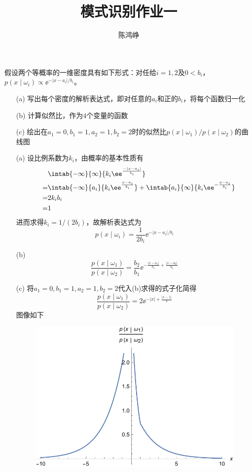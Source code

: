 \documentclass[reportComp]{thesis}
\title{模式识别作业一}
\subtitle{}
\author{陈鸿峥}
\begin{document}
\maketitle

\begin{question}[\textsection 2 Q2]
假设两个等概率的一维密度具有如下形式：对任给$i=1,2$及$0<b_i$，$p(x\mid\omega_i)\propto\ee^{-|x-a_i|/b_i}$。
\begin{itemize}
	\item [(a)] 写出每个密度的解析表达式，即对任意的$a_i$和正的$b_i$，将每个函数归一化
	\item [(b)] 计算似然比，作为$4$个变量的函数
	\item [(c)] 绘出在$a_1=0,b_1=1,a_2=1,b_2=2$时的似然比$p(x\mid\omega_1)/p(x\mid\omega_2)$的曲线图
\end{itemize}
\end{question}
\begin{answer}
\begin{itemize}
	\item [(a)] 设比例系数为$k_i$，由概率的基本性质有
\[\begin{aligned}
\qquad&\intab{-\infty}{\infty}{k_i\ee^{\frac{-|x-a_i|}{b_i}}}\\
=&\intab{-\infty}{a_i}{k_i\ee^{\frac{x-a_i}{b_i}}}+\intab{a_i}{\infty}{k_i\ee^{-\frac{x-a_i}{b_i}}}\\
=&2k_ib_i\\\
=&1
\end{aligned}\]
进而求得$k_i=1/(2b_i)$，故解析表达式为
\[p(x\mid\omega_i)=\frac{1}{2b_i}\ee^{-|x-a_i|/b_i}\]
	\item [(b)]
\[\frac{p(x\mid\omega_1)}{p(x\mid\omega_2)}=\frac{b_2}{b_1}\ee^{-\frac{|x-a_1|}{b_1}+\frac{|x-a_2|}{b_2}}\]
	\item [(c)]
将$a_1=0,b_1=1,a_2=1,b_2=2$代入(b)求得的式子化简得
\[\frac{p(x\mid\omega_1)}{p(x\mid\omega_2)}=2\ee^{-|x|+\frac{|x-1|}{2}}\]
图像如下
\begin{figure}[H]
\centering
\includegraphics[width=0.5\linewidth]{likelihood.pdf}
\end{figure}
\end{itemize}
\end{answer}
\end{document}

